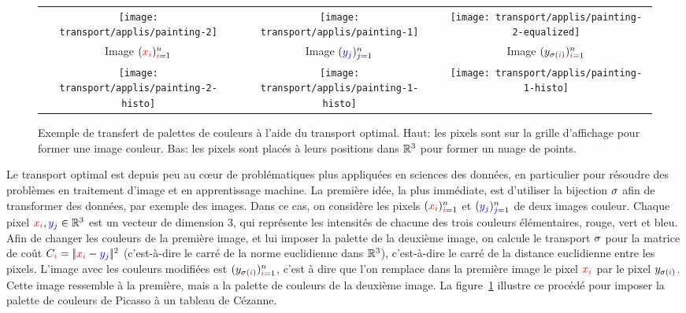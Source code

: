 \begin{figure}\centering
\begin{tabular}{@{}c@{\hspace{1mm}}c@{\hspace{1mm}}c@{}}
    \texttt{[image: transport/applis/painting-2]} &
    \texttt{[image: transport/applis/painting-1]} &
    \texttt{[image: transport/applis/painting-2-equalized]} \\
    Image $({\color{red}x_i})_{{\color{red}i}=1}^n$ & Image $({\color{blue}y_j})_{{\color{blue}j}=1}^n$ & Image  $(y_{\sigma({\color{red}i})})_{{\color{red}i}=1}^n$ \\
    \texttt{[image: transport/applis/painting-2-histo]}&
    \texttt{[image: transport/applis/painting-1-histo]}&
    \texttt{[image: transport/applis/painting-1-histo]}
\end{tabular}
\caption{\label{fig:image-eq} Exemple de transfert de palettes de couleurs à l'aide du transport optimal. 
	Haut: les pixels sont sur la grille d'affichage pour former une image couleur. 	
	Bas: les pixels sont placés à leurs positions dans $\mathbb{R}^3$ pour former un nuage de points. }
\end{figure}

Le transport optimal est depuis peu au c\oe{}ur de problématiques plus appliquées en sciences des données, en particulier pour résoudre des problèmes en traitement d'image et en apprentissage machine. 
%
La première idée, la plus immédiate, est d'utiliser la bijection $\sigma$ afin de transformer des données, par exemple des images. Dans ce cas, on considère les pixels $({\color{red}x_i})_{{\color{red}i}=1}^n$ et $({\color{blue}y_j})_{{\color{blue}j}=1}^n$ de deux images couleur. Chaque pixel ${\color{red}x_i}, {\color{blue}y_j} \in \mathbb{R}^3$ est un vecteur de dimension 3, qui représente les intensités de chacune des trois couleurs élémentaires, rouge, vert et bleu. Afin de changer les couleurs de la première image, et lui imposer la palette de la deuxième image, on calcule le transport $\sigma$ pour la matrice de coût $C_{{\color{red}i}} = |\!| {\color{red}x_i} - {\color{blue}y_j} |\!|^2$ (c'est-à-dire le carré de la norme euclidienne dans $\mathbb{R}^3$), c'est-à-dire le carré de la distance euclidienne entre les pixels. L'image avec les couleurs modifiées est $(y_{\sigma({\color{red}i})})_{{\color{red}i}=1}^n$, c'est à dire que l'on remplace dans la première image le pixel ${\color{red}x_i}$ par le pixel $y_{\sigma({\color{red}i})}$. Cette image ressemble à la première, mais a la palette de couleurs de la deuxième image.
%
La figure~\ref{fig:image-eq} illustre ce procédé pour imposer la palette de couleurs de Picasso à un tableau de Cézanne. 


